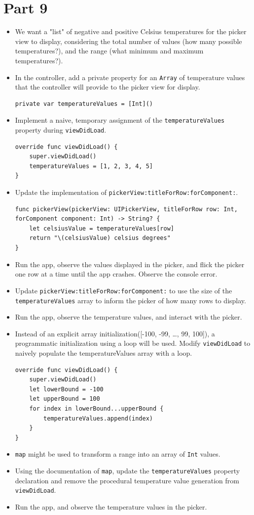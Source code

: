 \documentclass[a4paper,11pt]{scrartcl}
\begin{document}
\section*{Part 9}

\begin{itemize}
\item We want a "list" of negative and positive Celsius temperatures for the picker view to display, considering the total number of values (how many possible temperatures?), and the range (what minimum and maximum temperatures?).
\item In the controller, add a private property for an \texttt{Array} of temperature values that the controller will provide to the picker view for display.
\begin{lstlisting}
private var temperatureValues = [Int]()
\end{lstlisting}
\item Implement a naive, temporary assignment of the \texttt{temperatureValues} property during \texttt{viewDidLoad}.
\begin{lstlisting}
override func viewDidLoad() {
	super.viewDidLoad()
	temperatureValues = [1, 2, 3, 4, 5]
}
\end{lstlisting}
\item Update the implementation of \texttt{pickerView:titleForRow:forComponent:}.
\begin{lstlisting}
func pickerView(pickerView: UIPickerView, titleForRow row: Int, forComponent component: Int) -> String? {
	let celsiusValue = temperatureValues[row]
	return "\(celsiusValue) celsius degrees"
}
\end{lstlisting}
\item Run the app, observe the values displayed in the picker, and flick the picker one row at a time until the app crashes. Observe the console error.
\item Update \texttt{pickerView:titleForRow:forComponent:} to use the size of the \texttt{temperatureValues} array to inform the picker of how many rows to display.
\item Run the app, observe the temperature values, and interact with the picker.
\item Instead of an explicit array initialization([-100, -99, …, 99, 100]), a programmatic initialization using a loop will be used. Modify \texttt{viewDidLoad} to naively populate the temperatureValues array with a loop.
\begin{lstlisting}
override func viewDidLoad() {
	super.viewDidLoad()
	let lowerBound = -100
	let upperBound = 100
	for index in lowerBound...upperBound {
		temperatureValues.append(index)
	}
}
\end{lstlisting}
\item \texttt{map} might be used to transform a range into an array of \texttt{Int} values.
\item Using the documentation of \texttt{map}, update the \texttt{temperatureValues} property declaration and remove the procedural temperature value generation from \texttt{viewDidLoad}.
\item Run the app, and observe the temperature values in the picker.
\end{itemize}
\end{document}
